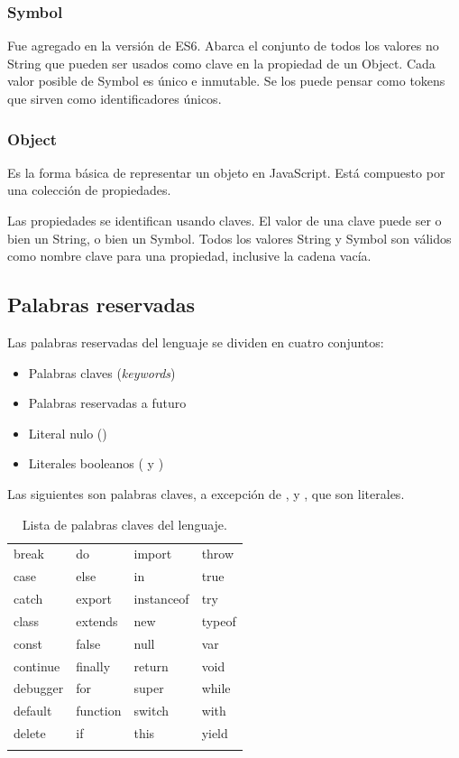 \subsubsection{Symbol} 
Fue agregado en la versión de ES6. Abarca el conjunto de todos los valores no String que pueden ser usados como clave en la propiedad de un Object. Cada valor posible de Symbol es único e inmutable. Se los puede pensar como tokens que sirven como identificadores únicos. 

\subsubsection{Object} 
Es la forma básica de representar un objeto en JavaScript. Está compuesto por una colección de propiedades.

Las propiedades se identifican usando claves. El valor de una clave puede ser o bien un String, o bien un Symbol. Todos los valores String y Symbol son válidos como nombre clave para una propiedad, inclusive la cadena vacía. 

\subsection{Palabras reservadas}

Las palabras reservadas del lenguaje se dividen en cuatro conjuntos:

\begin{itemize}
\item Palabras claves (\textit{keywords})
\item Palabras reservadas a futuro
\item Literal nulo ()
\item Literales booleanos ( y )
\end{itemize}

Las siguientes son palabras claves, a excepción de ,  y , que son literales.

\begin{table}[!h]
\caption{Lista de palabras claves del lenguaje.}
\label{tab:reservedkeywords}
\centering
\begin{tabular}{l l l l}
\toprule
break & do & import & throw\\
case & else & in & true\\
catch & export & instanceof & try\\
class & extends & new & typeof\\
const & false & null & var\\
continue & finally & return & void\\
debugger & for & super & while\\
default & function & switch & with\\
delete & if & this & yield\\
\bottomrule\\
\end{tabular}
\end{table}

